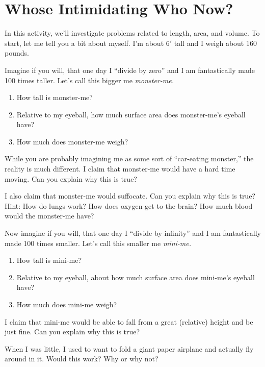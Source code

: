 \newpage
\section{Whose Intimidating Who Now?}

In this activity, we'll investigate problems related to length, area,
and volume. To start, let me tell you a bit about myself. I'm about
$6'$ tall and I weigh about 160 pounds.

\begin{prob}
Imagine if you will, that one day I ``divide by zero'' and I am
fantastically made 100 times taller. Let's call this bigger
me \textit{monster-me.}
\begin{enumerate}
\item How tall is monster-me?
\item Relative to my eyeball, how much surface area does monster-me's eyeball have?
\item How much does monster-me weigh?
\end{enumerate}
\end{prob}


\begin{prob}
While you are probably imagining me as some sort of ``car-eating
monster,'' the reality is much different. I claim that monster-me
would have a hard time moving.  Can you explain why this is true?
\end{prob}

\begin{prob}
I also claim that monster-me would suffocate.  Can you explain why
this is true? Hint: How do lungs work? How does oxygen get to the
brain? How much blood would the monster-me have?
\end{prob}



\begin{prob}
Now imagine if you will, that one day I ``divide by infinity'' and I
am fantastically made 100 times smaller. Let's call this smaller me
\textit{mini-me.}
\begin{enumerate}
\item How tall is mini-me?
\item Relative to my eyeball, about how much surface area does mini-me's eyeball have?
\item How much does mini-me weigh?
\end{enumerate}
\end{prob}


\begin{prob}
I claim that mini-me would be able to fall from a great (relative)
height and be just fine.  Can you explain why this is true?
\end{prob}



\begin{prob}
When I was little, I used to want to fold a giant paper airplane and
actually fly around in it. Would this work? Why or why not?
\end{prob}



